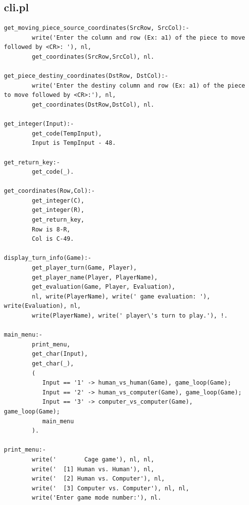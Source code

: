 \documentclass[a4paper]{article}
\begin{document}
\subsection{cli.pl}
\begin{lstlisting}[style=customprologwithlines]
get_moving_piece_source_coordinates(SrcRow, SrcCol):-
        write('Enter the column and row (Ex: a1) of the piece to move followed by <CR>: '), nl,
        get_coordinates(SrcRow,SrcCol), nl.

get_piece_destiny_coordinates(DstRow, DstCol):-
        write('Enter the destiny column and row (Ex: a1) of the piece to move followed by <CR>:'), nl,
        get_coordinates(DstRow,DstCol), nl.

get_integer(Input):-
        get_code(TempInput),
        Input is TempInput - 48.

get_return_key:-
        get_code(_).

get_coordinates(Row,Col):-
        get_integer(C),
        get_integer(R),
        get_return_key,
        Row is 8-R,
        Col is C-49.

display_turn_info(Game):-
        get_player_turn(Game, Player),
        get_player_name(Player, PlayerName),
        get_evaluation(Game, Player, Evaluation),
        nl, write(PlayerName), write(' game evaluation: '), write(Evaluation), nl,
        write(PlayerName), write(' player\'s turn to play.'), !.

main_menu:-
        print_menu,
        get_char(Input),
        get_char(_),
        (
           Input == '1' -> human_vs_human(Game), game_loop(Game);
           Input == '2' -> human_vs_computer(Game), game_loop(Game);
           Input == '3' -> computer_vs_computer(Game), game_loop(Game);
           main_menu
        ).

print_menu:-
        write('        Cage game'), nl, nl,
        write('  [1] Human vs. Human'), nl,
        write('  [2] Human vs. Computer'), nl,
        write('  [3] Computer vs. Computer'), nl, nl,
        write('Enter game mode number:'), nl.
\end{lstlisting}
\end{document}
